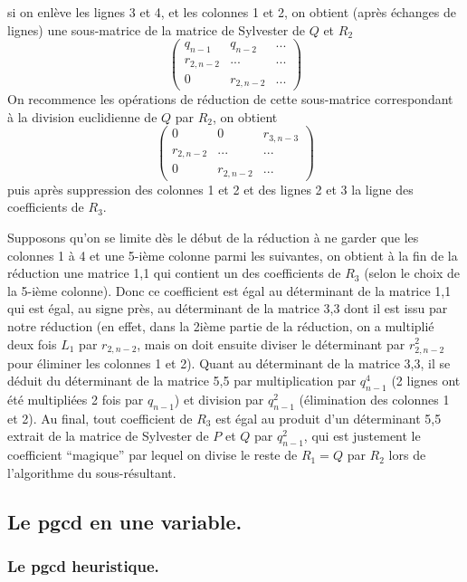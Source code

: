 \documentclass[a4paper,11pt]{article}
\begin{document}
si on enl\`eve les lignes 3 et 4, et les colonnes 1 et 2,
on obtient (apr\`es \'echanges
de lignes) une sous-matrice de la matrice de Sylvester de $Q$ et $R_2$
\[
\left( \begin{array}{ccc}
 q_{n-1} & q_{n-2} &  ... \\
 r_{2,n-2} & ... & ... \\
 0 & r_{2,n-2} &  ... 
\end{array} 
\right)
\]
On recommence les op\'erations de r\'eduction de cette sous-matrice
correspondant \`a la division euclidienne de $Q$ par $R_2$, on obtient
\[
\left( \begin{array}{ccc}
 0 & 0 & r_{3,n-3} \\
 r_{2,n-2} & ... & ... \\
 0 & r_{2,n-2} &  ... 
\end{array} 
\right)
\]
puis apr\`es suppression des colonnes 1 et 2 et des lignes 2 et 3
la ligne des coefficients de $R_3$.

Supposons qu'on se limite d\`es le d\'ebut de la r\'eduction \`a ne
garder que les colonnes 1 \`a 4 et une 5-i\`eme colonne parmi
les suivantes, on obtient \`a la fin de la r\'eduction
une matrice 1,1 qui contient
un des coefficients de $R_3$ (selon le choix de la 5-i\`eme colonne).
Donc ce coefficient est \'egal au d\'eterminant de la matrice 1,1
qui est \'egal, au signe pr\`es, au d\'eterminant de la matrice 3,3
dont il est issu par notre r\'eduction (en effet, dans la 2i\`eme
partie de la r\'eduction,
on a multipli\'e deux fois $L_1$ par $r_{2,n-2}$, mais on doit ensuite diviser 
le d\'eterminant par $r_{2,n-2}^2$ pour \'eliminer les colonnes 1 et 2).
Quant au d\'eterminant de la matrice 3,3, il se d\'eduit du
d\'eterminant de la matrice 5,5 par multiplication par $q_{n-1}^4$
(2 lignes ont \'et\'e multipli\'ees 2 fois par $q_{n-1}$) et division
par $q_{n-1}^2$ (\'elimination des colonnes 1 et 2). Au final,
tout coefficient de $R_3$ est \'egal au produit d'un d\'eterminant
5,5 extrait de la matrice de Sylvester de $P$ et $Q$ par $q_{n-1}^2$,
qui est justement le coefficient ``magique'' par lequel on divise le reste
de $R_1=Q$ par $R_2$ lors de l'algorithme du sous-r\'esultant.

\subsection{Le pgcd en une variable.}

\subsubsection{Le pgcd heuristique.}
\end{document}
